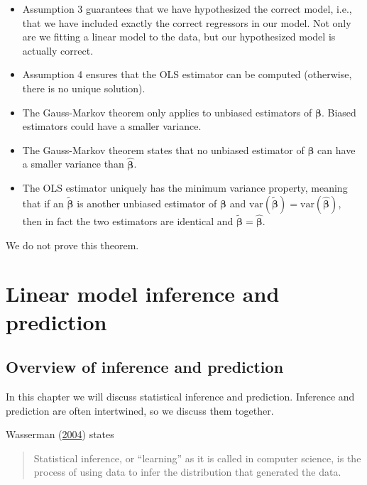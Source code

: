 \documentclass[
]{book}
\providecommand{\tightlist}{%
  \setlength{\itemsep}{0pt}\setlength{\parskip}{0pt}}
\theoremstyle{definition}
\theoremstyle{definition}
\theoremstyle{definition}
\theoremstyle{definition}
\theoremstyle{remark}
\begin{document}
\begin{itemize}
\tightlist
\item
  Assumption 3 guarantees that we have hypothesized the correct model, i.e., that we have included exactly the correct regressors in our model. Not only are we fitting a linear model to the data, but our hypothesized model is actually correct.
\item
  Assumption 4 ensures that the OLS estimator can be computed (otherwise, there is no unique solution).
\item
  The Gauss-Markov theorem only applies to unbiased estimators of \(\boldsymbol{\beta}\). Biased estimators could have a smaller variance.
\item
  The Gauss-Markov theorem states that no unbiased estimator of \(\boldsymbol{\beta}\) can have a smaller variance than \(\hat{\boldsymbol{\beta}}\).
\item
  The OLS estimator uniquely has the minimum variance property, meaning that if an \(\tilde{\boldsymbol{\beta}}\) is another unbiased estimator of \(\boldsymbol{\beta}\) and \(\mathrm{var}(\tilde{\boldsymbol{\beta}}) = \mathrm{var}(\hat{\boldsymbol{\beta}})\), then in fact the two estimators are identical and \(\tilde{\boldsymbol{\beta}}=\hat{\boldsymbol{\beta}}\).
\end{itemize}

We do not prove this theorem.

\hypertarget{inference}{%
\chapter{Linear model inference and prediction}\label{inference}}

\hypertarget{overview-of-inference-and-prediction}{%
\section{Overview of inference and prediction}\label{overview-of-inference-and-prediction}}

In this chapter we will discuss statistical inference and prediction. Inference and prediction are often intertwined, so we discuss them together.

Wasserman (\protect\hyperlink{ref-wasserman2004all}{2004}) states

\begin{quote}
Statistical inference, or ``learning'' as it is called in computer science, is the process of using data to infer the distribution that generated the data.
\end{quote}
\end{document}
